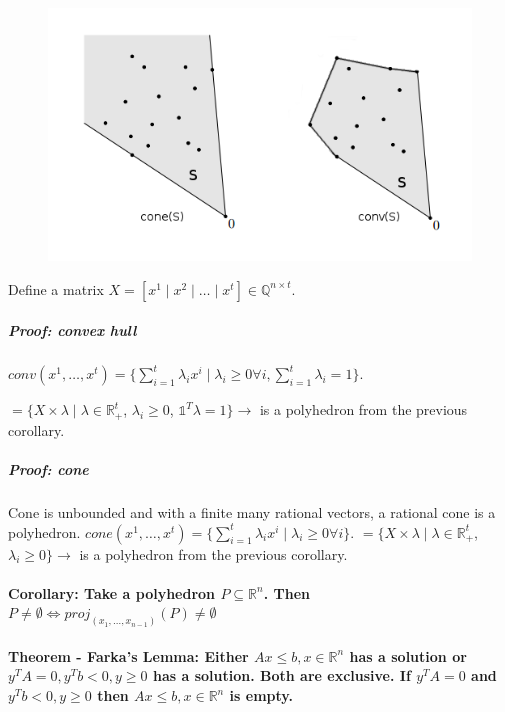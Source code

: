 \documentclass[main]{subfiles}
\begin{document}
\begin{figure}[!h]
  \label{fig:projection}
  \centering
    \includegraphics{imgs/conv-cone.png}
\end{figure}

Define a matrix $X =[x^1 \mid x^2 \mid \dots \mid x^t] \in
\mathbb{Q}^{n \times t}$.

\subparagraph{Proof: convex hull}
$conv(x^1, \dots, x^t) = \{ \sum_{i=1}^{t} \lambda_i x^i \mid \lambda_i \geq 0
\forall i, \sum_{i=1}^t \lambda_i = 1 \}$.

$ = \{ X \times \lambda \mid \lambda \in \mathbb{R}^t_+$, $\lambda_i \geq 0$, 
$\mathds{1}^T \lambda = 1 \} \rightarrow $ is a polyhedron from the previous
corollary.

\subparagraph{Proof: cone}
Cone is unbounded and with a finite many rational vectors, a rational cone is a 
polyhedron.
$cone(x^1, \dots, x^t) = \{ \sum_{i=1}^{t} \lambda_i x^i \mid \lambda_i \geq 0
\forall i \}$.
$ = \{ X \times \lambda \mid \lambda \in \mathbb{R}^t_+$, $\lambda_i \geq 0 \}
\rightarrow $ is a polyhedron from the previous corollary.

\paragraph{Corollary: Take a polyhedron $P \subseteq \mathbb{R}^n$. Then $P
\neq \emptyset \iff proj_{(x_1, \dots, x_{n-1})}(P) \neq \emptyset$}

\paragraph{Theorem - Farka's Lemma: Either $Ax \leq b, x \in \mathbb{R}^n$ has
a solution or $y^T A = 0, y^T b < 0, y \geq 0$ has a solution. Both are
exclusive. If $y^T A = 0$ and $y^T b < 0, y \geq 0$ then $Ax \leq b, x \in
\mathbb{R}^n$ is empty.}
\end{document}
